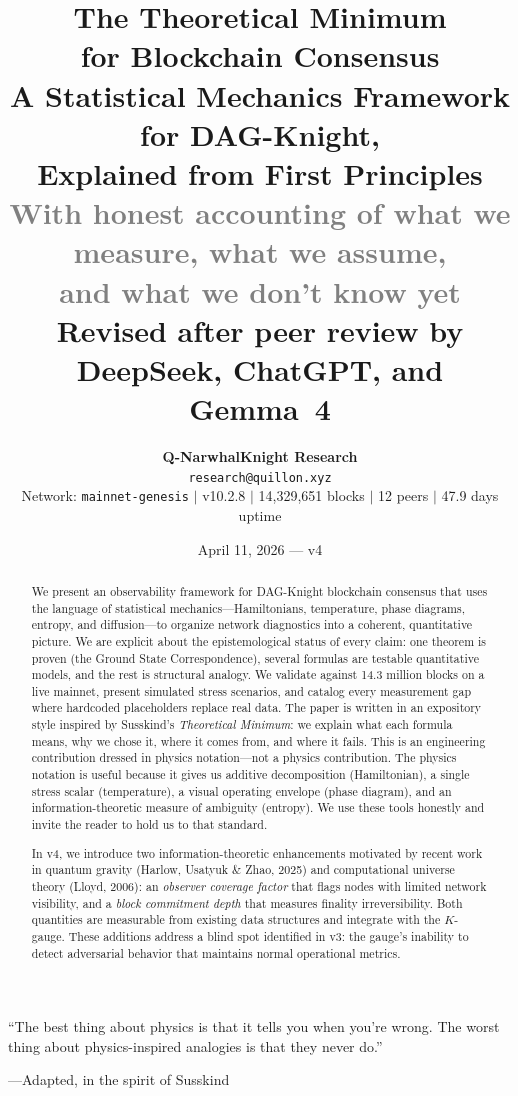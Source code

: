 \documentclass[11pt,a4paper]{article}
\title{%
\vspace{-1cm}
{\LARGE\textbf{The Theoretical Minimum\\for Blockchain Consensus}}\\[0.4cm]
{\large A Statistical Mechanics Framework for DAG-Knight,\\Explained from First Principles}\\[0.4cm]
{\normalsize\textcolor{gray}{With honest accounting of what we measure, what we assume,\\and what we don't know yet}}\\[0.3cm]
{\small\textcolor{sectionblue}{Revised after peer review by DeepSeek, ChatGPT, and Gemma~4}}
}
\author{%
\textbf{Q-NarwhalKnight Research}\\
\texttt{research@quillon.xyz}\\[0.2cm]
{\small Network: \texttt{mainnet-genesis} $\mid$ v10.2.8 $\mid$ 14,329,651 blocks $\mid$ 12 peers $\mid$ 47.9 days uptime}
}
\date{April 11, 2026 --- v4}
\begin{document}
\maketitle

\epigraph{``The best thing about physics is that it tells you when you're wrong. The worst thing about physics-inspired analogies is that they never do.''}{---Adapted, in the spirit of Susskind}

\begin{abstract}
We present an observability framework for DAG-Knight blockchain consensus that uses the language of statistical mechanics---Hamiltonians, temperature, phase diagrams, entropy, and diffusion---to organize network diagnostics into a coherent, quantitative picture. We are explicit about the epistemological status of every claim: one theorem is proven (the Ground State Correspondence), several formulas are testable quantitative models, and the rest is structural analogy. We validate against 14.3 million blocks on a live mainnet, present simulated stress scenarios, and catalog every measurement gap where hardcoded placeholders replace real data. The paper is written in an expository style inspired by Susskind's \emph{Theoretical Minimum}: we explain what each formula means, why we chose it, where it comes from, and where it fails. This is an engineering contribution dressed in physics notation---not a physics contribution. The physics notation is useful because it gives us additive decomposition (Hamiltonian), a single stress scalar (temperature), a visual operating envelope (phase diagram), and an information-theoretic measure of ambiguity (entropy). We use these tools honestly and invite the reader to hold us to that standard.

In v4, we introduce two information-theoretic enhancements motivated by recent work in quantum gravity (Harlow, Usatyuk \& Zhao, 2025) and computational universe theory (Lloyd, 2006): an \emph{observer coverage factor} that flags nodes with limited network visibility, and a \emph{block commitment depth} that measures finality irreversibility. Both quantities are measurable from existing data structures and integrate with the $K$-gauge. These additions address a blind spot identified in v3: the gauge's inability to detect adversarial behavior that maintains normal operational metrics.
\end{abstract}
\end{document}

